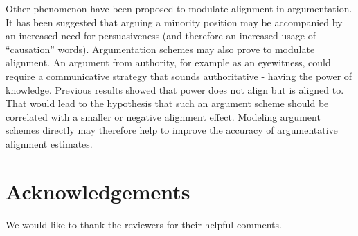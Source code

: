 \documentclass[11pt,a4paper]{article}
\begin{document}
Other phenomenon have been proposed to modulate alignment in argumentation. It has been suggested that arguing a minority position may be accompanied by an increased need for persuasiveness \cite{PennebakerMN03} (and therefore an increased usage of ``causation'' words). Argumentation schemes may also prove to modulate alignment. An argument from authority, for example as an eyewitness, could require a communicative strategy that sounds authoritative - having the power of knowledge. Previous results showed that power does not align but is aligned to. That would lead to the hypothesis that such an argument scheme should be correlated with a smaller or negative alignment effect. Modeling argument schemes directly may therefore help to improve the accuracy of argumentative alignment estimates.

\section*{Acknowledgements}

We would like to thank the reviewers for their helpful comments.



\end{document}
